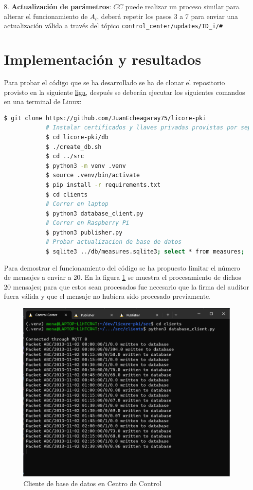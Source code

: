 \documentclass{article}
\begin{document}
            8. \textbf{Actualización de parámetros}: $CC$ puede realizar un proceso similar para alterar el funcionamiento de $A_i$, deberá repetir los pasos 3 a 7 para enviar una actualización válida a través del tópico \texttt{control\_center/updates/ID\_i/\#}

    \section{Implementación y resultados}

        Para probar el código que se ha desarrollado se ha de clonar el repositorio provisto en la siguiente \href{https://github.com/JuanEcheagaray75/licore-pki}{liga}, después se deberán ejecutar los siguientes comandos en una terminal de Linux:
        \begin{lstlisting}[language=bash]
            $ git clone https://github.com/JuanEcheagaray75/licore-pki
            # Instalar certificados y llaves privadas provistas por separado
            $ cd licore-pki/db
            $ ./create_db.sh
            $ cd ../src
            $ python3 -m venv .venv
            $ source .venv/bin/activate
            $ pip install -r requirements.txt
            $ cd clients
            # Correr en laptop
            $ python3 database_client.py
            # Correr en Raspberry Pi
            $ python3 publisher.py
            # Probar actualizacion de base de datos
            $ sqlite3 ../db/measures.sqlite3; select * from measures;
        \end{lstlisting}

        Para demostrar el funcionamiento del código se ha propuesto limitar el número de mensajes a enviar a 20. En la figura \ref{fig:db_client} se muestra el procesamiento de dichos 20 mensajes; para que estos sean procesados fue necesario que la firma del auditor fuera válida y que el mensaje no hubiera sido procesado previamente.
        \begin{figure}[!htbp]
            \centering
            \includegraphics[scale=0.5]{database_client.png}
            \caption{Cliente de base de datos en Centro de Control}
            \label{fig:db_client}
        \end{figure}
\end{document}
